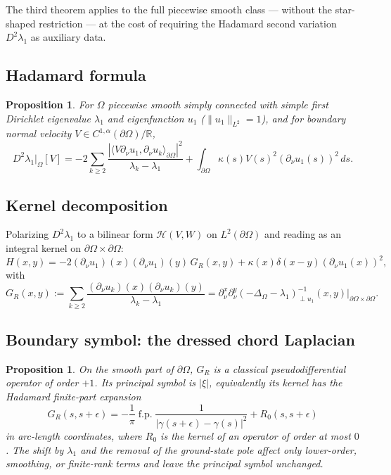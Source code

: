 \documentclass[11pt,reqno]{amsart}
\theoremstyle{plain}
\newtheorem{proposition}[theorem]{Proposition}
\theoremstyle{definition}
\theoremstyle{remark}
\newcommand{\Reals}{\mathbb{R}}
\newcommand{\Hcal}{\mathcal{H}}
\begin{document}
The third theorem applies to the full piecewise smooth class — without the star-shaped restriction — at the cost of requiring the Hadamard second variation $D^2\lambda_1$ as auxiliary data.

\subsection{Hadamard formula}\label{ss:hadamard-formula-master}

\begin{proposition}\label{prop:hadamard-master}
For $\Omega$ piecewise smooth simply connected with simple first Dirichlet eigenvalue $\lambda_1$ and eigenfunction $u_1$ ($\|u_1\|_{L^2} = 1$), and for boundary normal velocity $V \in C^{1,\alpha}(\partial\Omega)/\Reals$,
\[
D^2\lambda_1|_\Omega[V] = -2\sum_{k\geq 2}\frac{|\langle V\partial_\nu u_1, \partial_\nu u_k\rangle_{\partial\Omega}|^2}{\lambda_k - \lambda_1} + \int_{\partial\Omega}\kappa(s) V(s)^2 (\partial_\nu u_1(s))^2\,ds.
\]
\end{proposition}

\subsection{Kernel decomposition}\label{ss:kernel-decomp-master}

Polarizing $D^2\lambda_1$ to a bilinear form $\Hcal(V, W)$ on $L^2(\partial\Omega)$ and reading as an integral kernel on $\partial\Omega \times \partial\Omega$:
\[
H(x, y) = -2(\partial_\nu u_1)(x)(\partial_\nu u_1)(y)\, G_R(x, y) + \kappa(x) \delta(x - y)(\partial_\nu u_1(x))^2,
\]
with
\[
G_R(x, y) := \sum_{k\geq 2}\frac{(\partial_\nu u_k)(x)(\partial_\nu u_k)(y)}{\lambda_k - \lambda_1}
=\partial_\nu^x\partial_\nu^y(-\Delta_\Omega-\lambda_1)^{-1}_{\perp u_1}(x,y)\big|_{\partial\Omega\times\partial\Omega}.
\]

\subsection{Boundary symbol: the dressed chord Laplacian}\label{ss:hadamard-symbol-master}

\begin{proposition}\label{prop:boundary-resolvent-symbol-master}
On the smooth part of $\partial\Omega$, $G_R$ is a classical pseudodifferential operator of order $+1$. Its principal symbol is $|\xi|$, equivalently its kernel has the Hadamard finite-part expansion
\[
G_R(s,s+\epsilon)
=-\frac{1}{\pi}\operatorname{f.p.}\frac{1}{|\gamma(s+\epsilon)-\gamma(s)|^2}
+R_0(s,s+\epsilon)
\]
in arc-length coordinates, where $R_0$ is the kernel of an operator of order at most $0$. The shift by $\lambda_1$ and the removal of the ground-state pole affect only lower-order, smoothing, or finite-rank terms and leave the principal symbol unchanged.
\end{proposition}
\end{document}
